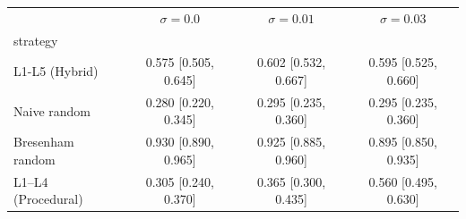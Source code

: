 \begin{tabular}{lccc}
\toprule
 & $\sigma=0.0$ & $\sigma=0.01$ & $\sigma=0.03$ \\
strategy &  &  &  \\
\midrule
L1-L5 (Hybrid) & 0.575 [0.505, 0.645] & 0.602 [0.532, 0.667] & 0.595 [0.525, 0.660] \\
Naive random & 0.280 [0.220, 0.345] & 0.295 [0.235, 0.360] & 0.295 [0.235, 0.360] \\
Bresenham random & 0.930 [0.890, 0.965] & 0.925 [0.885, 0.960] & 0.895 [0.850, 0.935] \\
L1–L4 (Procedural) & 0.305 [0.240, 0.370] & 0.365 [0.300, 0.435] & 0.560 [0.495, 0.630] \\
\bottomrule
\end{tabular}
